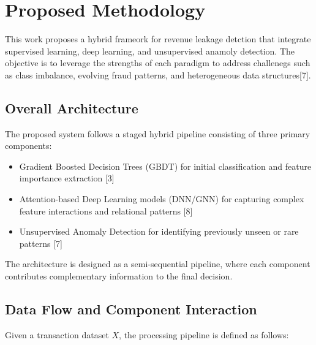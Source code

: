 \documentclass[conference]{IEEEtran}
\begin{document}

\section{Proposed Methodology}

This work proposes a hybrid frameork for revenue leakage detction that integrate supervised learning, deep learning, and unsupervised anamoly detection. The objective is to leverage the strengths of each paradigm to address challenegs such as class imbalance, evolving fraud patterns, and heterogeneous data structures[7].

\subsection{Overall Architecture}

The proposed system follows a staged hybrid pipeline consisting of three primary components:
\begin{itemize}
    \item Gradient Boosted Decision Trees (GBDT) for initial classification and feature importance extraction [3]
    \item Attention-based Deep Learning models (DNN/GNN) for capturing complex feature interactions and relational patterns [8]
    \item Unsupervised Anomaly Detection for identifying previously unseen or rare patterns [7]
\end{itemize}

The architecture is designed as a semi-sequential pipeline, where each component contributes complementary information to the final decision.

\subsection{Data Flow and Component Interaction}

Given a transaction dataset $X$, the processing pipeline is defined as follows:
\end{document}
